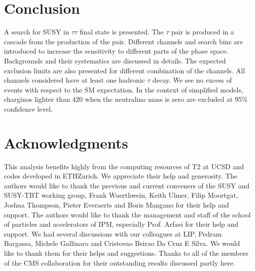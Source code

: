 \section{Conclusion}
\label{sect:conclusion}
A search for SUSY in $\tau\tau$ final state is presented. The $\tau$ pair is produced in a cascade from the production of the \PSGcpDo pair.
Different channels and search bins are introduced to increase the sensitivity to different parts of the phase space. 
Backgrounds and their systematics are discussed in details. The expected exclusion limits are also presented for different combination of the 
channels.
All channels considered have at least one hadronic $\tau$ decay.
We see no excess of events with respect to the SM expectation.
In the context of simplified models, charginos lighter than 420 \GeV when the neutralino mass is zero
are excluded at 95\% confidence level.

\section{Acknowledgments}
This analysis benefits highly from the computing resources of T2 at UCSD and codes developed in ETHZurich. 
We appreciate their help and generosity.
The authors would like to thank the previous and current conveners of the SUSY and SUSY-TBT working group, Frank Wuerthwein, Keith Ulmer, Filip Moortgat, Joshua Thompson, Pieter Everaerts and Boris Mangano for their help and support. 
The authors would like to thank the management and staff of the school of particles 
and accelerators of IPM, especially Prof. Arfaei for their help and support. 
We had several discussions with our colleagues at LIP, Pedram Bargassa, Michele Gallinaro and Cristovao Beirao Da Cruz E Silva. 
We would like to thank them for their helps and suggestions.
Thanks to all of the members of
the CMS collaboration for their outstanding results discussed partly here.
